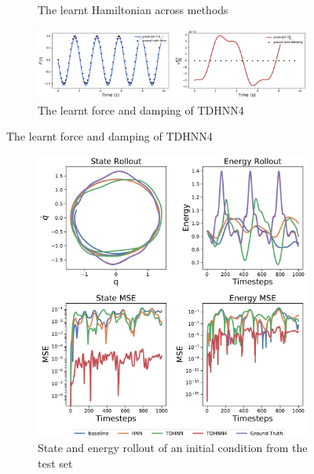 \documentclass{article}
\begin{document}
\begin{figure}[!htb]
\begin{subfigure}[b]{0.48\textwidth}
\caption{The learnt Hamiltonian across methods}
\end{subfigure}
\begin{subfigure}[b]{0.48\textwidth}
\includegraphics[width=\textwidth]{figures/figures/forced_mass_spring/1/forced_mass_spring_dpdt_new_0.pdf}
\caption{The learnt force and damping of TDHNN4}
\end{subfigure}
\label{forced_mspring_1_full}
\end{figure}
\begin{figure}[!htb]
\centering
\captionsetup{justification=centering}
\begin{subfigure}[b]{0.48\textwidth}
\includegraphics[width=\textwidth]{figures/figures/forced_mass_spring/2/forced_mass_spring_long_0.pdf}
\caption{State and energy rollout of an initial condition from the test set}
\end{subfigure}
\begin{subfigure}[b]{0.48\textwidth}

\end{subfigure}
\end{figure}
\end{document}
